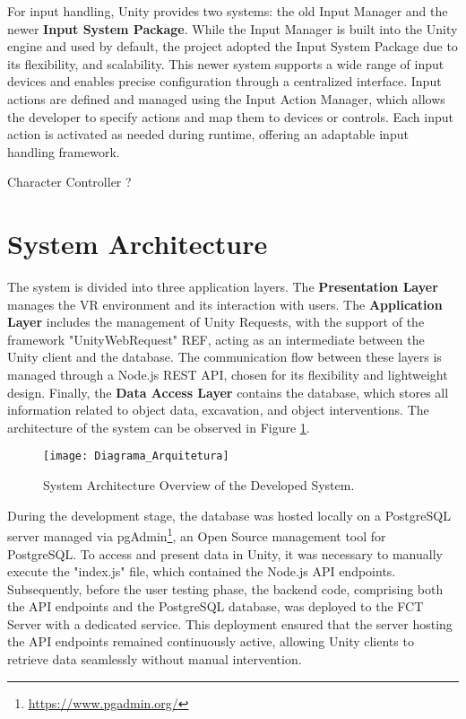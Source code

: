 For input handling, Unity provides two systems: the old Input Manager and the newer \textbf{Input System Package}. 
While the Input Manager is built into the Unity engine and used by default, the project adopted the Input System Package due to its flexibility, and scalability. 
This newer system supports a wide range of input devices and enables precise configuration through a centralized interface. Input actions are defined and managed using the Input Action Manager, which allows the developer to specify actions and map them to devices or controls. 
Each input action is activated as needed during runtime, offering an adaptable input handling framework.


Character Controller ?

\section{System Architecture}

The system is divided into three application layers.
The \textbf{Presentation Layer} manages the \gls{VR} environment and its interaction with users. The \textbf{Application Layer} includes the management of Unity Requests, with the support of the framework "UnityWebRequest" REF, acting as an intermediate between the Unity client and the database. 
The communication flow between these layers is managed through a Node.js REST API, chosen for its flexibility and lightweight design. 
Finally, the \textbf{Data Access Layer} contains the database, which stores all information related to object data, excavation, and object interventions. 
The architecture of the system can be observed in Figure \ref{fig:architecture}.
\begin{figure}[h!]
    \centering
    \texttt{[image: Diagrama\_Arquitetura]}
    \caption{System Architecture Overview of the Developed System.} 
    \label{fig:architecture}
\end{figure}

During the development stage, the database was hosted locally on a PostgreSQL server managed via pgAdmin\footnote{\url{https://www.pgadmin.org/}}, an Open Source management tool for PostgreSQL. To access and present data in Unity, it was necessary to manually execute the "index.js" file, which contained the Node.js API endpoints.
Subsequently, before the user testing phase, the backend code, comprising both the API endpoints and the PostgreSQL database, was deployed to the FCT Server with a dedicated service.
This deployment ensured that the server hosting the API endpoints remained continuously active, allowing Unity clients to retrieve data seamlessly without manual intervention.

